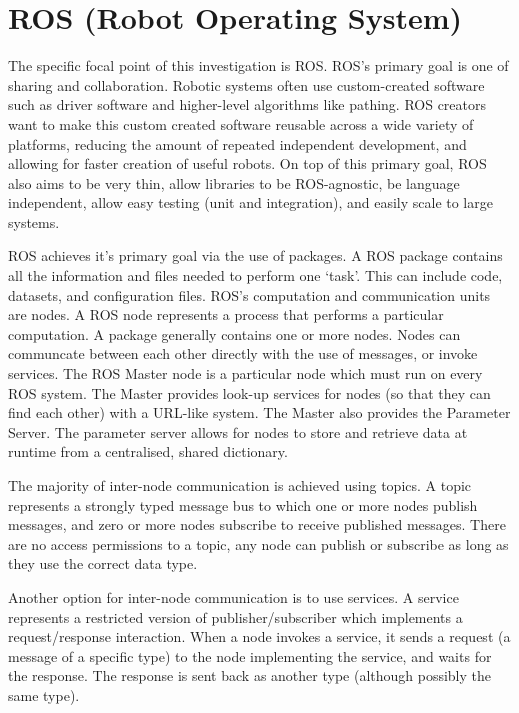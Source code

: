 \documentclass[../dissertation.tex]{subfiles}
\begin{document}
\section{ROS (Robot Operating System)}
\label{background-ros}

The specific focal point of this investigation is ROS. ROS's primary goal is one of sharing and collaboration. Robotic systems often use custom-created software such as driver software and higher-level algorithms like pathing. ROS creators want to make this custom created software reusable across a wide variety of platforms, reducing the amount of repeated independent development, and allowing for faster creation of useful robots. On top of this primary goal, ROS also aims to be very thin, allow libraries to be ROS-agnostic, be language independent, allow easy testing (unit and integration), and easily scale to large systems.

ROS achieves it's primary goal via the use of packages. A ROS package contains all the information and files needed to perform one `task'. This can include code, datasets, and configuration files. ROS's computation and communication units are nodes. A ROS node represents a process that performs a particular computation. A package generally contains one or more nodes. Nodes can communcate between each other directly with the use of messages, or invoke services. The ROS Master node is a particular node which must run on every ROS system. The Master provides look-up services for nodes (so that they can find each other) with a URL-like system. The Master also provides the Parameter Server. The parameter server allows for nodes to store and retrieve data at runtime from a centralised, shared dictionary.

The majority of inter-node communication is achieved using topics. A topic represents a strongly typed message bus to which one or more nodes publish messages, and zero or more nodes subscribe to receive published messages. There are no access permissions to a topic, any node can publish or subscribe as long as they use the correct data type.

Another option for inter-node communication is to use services. A service represents a restricted version of publisher/subscriber which implements a request/response interaction. When a node invokes a service, it sends a request (a message of a specific type) to the node implementing the service, and waits for the response. The response is sent back as another type (although possibly the same type).
\end{document}
